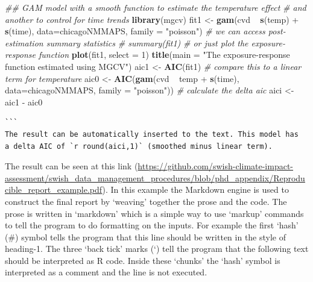 \documentclass[11pt,a4paper]{article}
\newenvironment{Shaded}{\begin{snugshade}}{\end{snugshade}}
\newcommand{\KeywordTok}[1]{\textcolor[rgb]{0.13,0.29,0.53}{\textbf{{#1}}}}
\newcommand{\DataTypeTok}[1]{\textcolor[rgb]{0.13,0.29,0.53}{{#1}}}
\newcommand{\DecValTok}[1]{\textcolor[rgb]{0.00,0.00,0.81}{{#1}}}
\newcommand{\StringTok}[1]{\textcolor[rgb]{0.31,0.60,0.02}{{#1}}}
\newcommand{\CommentTok}[1]{\textcolor[rgb]{0.56,0.35,0.01}{\textit{{#1}}}}
\newcommand{\NormalTok}[1]{{#1}}
\begin{document}
\begin{small}
\begin{singlespace}
\begin{Shaded}
\begin{Shaded}
\begin{Highlighting}[]
\CommentTok{## GAM model with a smooth function to estimate the temperature effect}
\CommentTok{# and another to control for time trends}
\KeywordTok{library}\NormalTok{(mgcv)}
\NormalTok{fit1 <-}\StringTok{ }\KeywordTok{gam}\NormalTok{(cvd ~}\StringTok{ }\KeywordTok{s}\NormalTok{(temp) +}\StringTok{ }\KeywordTok{s}\NormalTok{(time), }\DataTypeTok{data=}\NormalTok{chicagoNMMAPS, }\DataTypeTok{family =} \StringTok{"poisson"}\NormalTok{) }
\CommentTok{# we can access post-estimation summary statistics}
\CommentTok{# summary(fit1)}
\CommentTok{# or just plot the exposure-response function}
\KeywordTok{plot}\NormalTok{(fit1, }\DataTypeTok{select =} \DecValTok{1}\NormalTok{)}
\KeywordTok{title}\NormalTok{(}\DataTypeTok{main =} \StringTok{"The exposure-response function estimated using MGCV"}\NormalTok{)}
\NormalTok{aic1 <-}\StringTok{ }\KeywordTok{AIC}\NormalTok{(fit1)}
\CommentTok{# compare this to a linear term for temperature}
\NormalTok{aic0 <-}\StringTok{ }\KeywordTok{AIC}\NormalTok{(}\KeywordTok{gam}\NormalTok{(cvd ~}\StringTok{ }\NormalTok{temp +}\StringTok{ }\KeywordTok{s}\NormalTok{(time), }\DataTypeTok{data=}\NormalTok{chicagoNMMAPS, }\DataTypeTok{family =} \StringTok{"poisson"}\NormalTok{))}
\CommentTok{# calculate the delta aic}
\NormalTok{aici <-}\StringTok{ }\NormalTok{aic1 -}\StringTok{ }\NormalTok{aic0 }
\end{Highlighting}
\end{Shaded}
\begin{BVerbatim}
```
The result can be automatically inserted to the text. This model has
a delta AIC of `r round(aici,1)` (smoothed minus linear term).
\end{BVerbatim}
\end{Shaded}
\end{singlespace}
\end{small}
\clearpage
The result can be seen at this link (\url{https://github.com/swish-climate-impact-assessment/swish_data_management_procedures/blob/phd_appendix/Reproducible_report_example.pdf}). In this example the Markdown engine is used to construct the final report by `weaving' together the prose and the code.  The prose is written in `markdown' which is a simple way to use `markup' commands to tell the program to do formatting on the inputs.  For example the first `hash' (\#) symbol tells the program that this line should be written in the style of heading-1.  The three `back tick' marks (`) tell the program that the following text should be interpreted as R code.  Inside these `chunks' the `hash' symbol is interpreted as a comment and the line is not executed.
\end{document}
